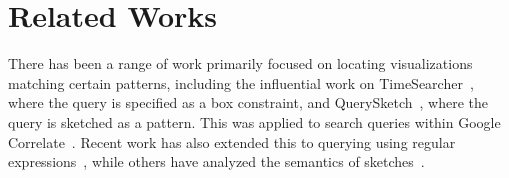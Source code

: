 \section{Related Works \label{sec:relatedworks}}
There has been a range of work primarily focused on locating visualizations
matching certain patterns, including the influential work on TimeSearcher~\cite{hochheiser2004dynamic}, where the query is
specified as a box constraint, and QuerySketch~\cite{wattenberg2001sketching}, where the query is sketched as a pattern.
This was applied to search queries within Google Correlate~\cite{mohebbi2011google}.
Recent work has also extended this to querying using regular
expressions~\cite{Zgraggen2015}, while
others have analyzed the semantics
of sketches~\cite{correll2016semantics,Mannino2018}.


